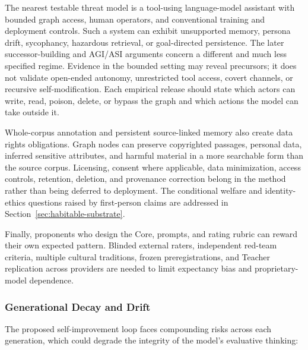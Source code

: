 \documentclass[11pt]{article}
\begin{document}
The nearest testable threat model is a tool-using language-model assistant with
bounded graph access, human operators, and conventional training and deployment
controls. Such a system can exhibit unsupported memory, persona drift,
sycophancy, hazardous retrieval, or goal-directed persistence. The later
successor-building and AGI/ASI arguments concern a different and much less
specified regime. Evidence in the bounded setting may reveal precursors; it
does not validate open-ended autonomy, unrestricted tool access, covert
channels, or recursive self-modification. Each empirical release should state
which actors can write, read, poison, delete, or bypass the graph and which
actions the model can take outside it.

Whole-corpus annotation and persistent source-linked memory also create data
rights obligations. Graph nodes can preserve copyrighted passages, personal
data, inferred sensitive attributes, and harmful material in a more searchable
form than the source corpus. Licensing, consent where applicable, data
minimization, access controls, retention, deletion, and provenance correction
belong in the method rather than being deferred to deployment. The conditional welfare and identity-ethics questions raised by first-person
claims are addressed in Section~\ref{sec:habitable-substrate}.

Finally, proponents who design the Core, prompts, and rating rubric can reward
their own expected pattern. Blinded external raters, independent red-team
criteria, multiple cultural traditions, frozen preregistrations, and Teacher
replication across providers are needed to limit expectancy bias and
proprietary-model dependence.

\subsubsection{Generational Decay and Drift}\label{sec:generational-decay}

The proposed self-improvement loop faces compounding risks across each generation, which could degrade the integrity of the model's evaluative thinking:
\end{document}
